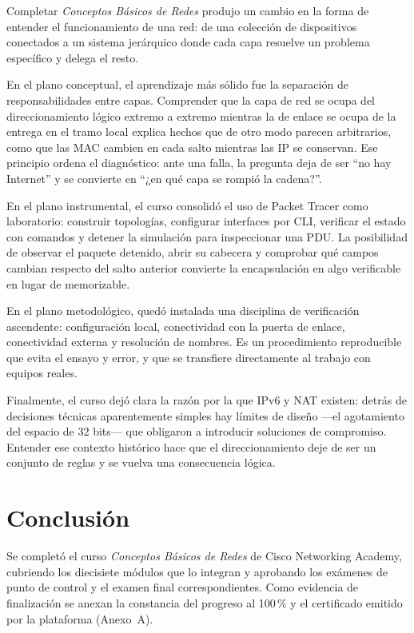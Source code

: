 \documentclass[11pt,a4paper]{article}
\begin{document}
Completar \textit{Conceptos Básicos de Redes} produjo un cambio en la forma de
entender el funcionamiento de una red: de una colección de dispositivos
conectados a un sistema jerárquico donde cada capa resuelve un problema
específico y delega el resto.

En el plano conceptual, el aprendizaje más sólido fue la separación de
responsabilidades entre capas. Comprender que la capa de red se ocupa del
direccionamiento lógico extremo a extremo mientras la de enlace se ocupa de la
entrega en el tramo local explica hechos que de otro modo parecen arbitrarios,
como que las MAC cambien en cada salto mientras las IP se conservan. Ese
principio ordena el diagnóstico: ante una falla, la pregunta deja de ser
``no hay Internet'' y se convierte en ``¿en qué capa se rompió la cadena?''.

En el plano instrumental, el curso consolidó el uso de Packet Tracer como
laboratorio: construir topologías, configurar interfaces por CLI, verificar el
estado con comandos y detener la simulación para inspeccionar una PDU. La
posibilidad de observar el paquete detenido, abrir su cabecera y comprobar qué
campos cambian respecto del salto anterior convierte la encapsulación en algo
verificable en lugar de memorizable.

En el plano metodológico, quedó instalada una disciplina de verificación
ascendente: configuración local, conectividad con la puerta de enlace,
conectividad externa y resolución de nombres. Es un procedimiento reproducible
que evita el ensayo y error, y que se transfiere directamente al trabajo con
equipos reales.

Finalmente, el curso dejó clara la razón por la que IPv6 y NAT existen: detrás
de decisiones técnicas aparentemente simples hay límites de diseño —el
agotamiento del espacio de 32 bits— que obligaron a introducir soluciones de
compromiso. Entender ese contexto histórico hace que el direccionamiento deje
de ser un conjunto de reglas y se vuelva una consecuencia lógica.

\section{Conclusión}

Se completó el curso \textit{Conceptos Básicos de Redes} de Cisco Networking
Academy, cubriendo los diecisiete módulos que lo integran y aprobando los
exámenes de punto de control y el examen final correspondientes. Como
evidencia de finalización se anexan la constancia del progreso al 100\,\% y el
certificado emitido por la plataforma (Anexo~A).
\end{document}
